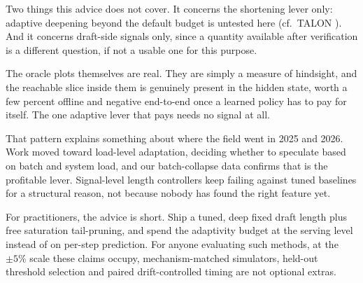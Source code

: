 \documentclass[conference]{IEEEtran}
\begin{document}
Two things this advice does not cover. It concerns the shortening lever only: adaptive
deepening beyond the default budget is untested here (cf.\ TALON \cite{talon}). And it
concerns draft-side signals only, since a quantity available after verification is a different
question, if not a usable one for this purpose.

The oracle plots themselves are real. They are simply a measure of hindsight, and the reachable
slice inside them is genuinely present in the hidden state, worth a few percent offline and
negative end-to-end once a learned policy has to pay for itself. The one adaptive lever that
pays needs no signal at all.

That pattern explains something about where the field went in 2025 and 2026. Work moved toward
load-level adaptation, deciding whether to speculate based on batch and system load, and our
batch-collapse data confirms that is the profitable lever. Signal-level length controllers keep
failing against tuned baselines for a structural reason, not because nobody has found the
right feature yet.

For practitioners, the advice is short. Ship a tuned, deep fixed draft length plus free
saturation tail-pruning, and spend the adaptivity budget at the serving level instead of on
per-step prediction. For anyone evaluating such methods, at the $\pm5\%$ scale these claims
occupy, mechanism-matched simulators, held-out threshold selection and paired drift-controlled
timing are not optional extras.
\end{document}

